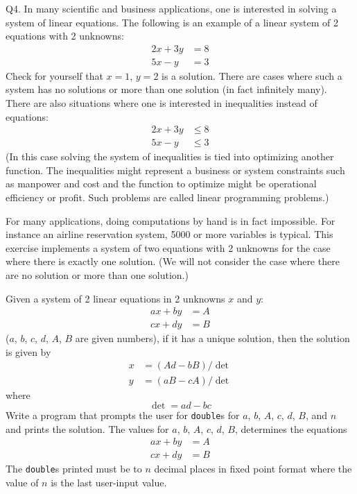 Q4. In many scientific and business applications, one is interested in solving a 
system of linear
equations. 
The following is an example of a linear system of 2 equations with 2 unknowns:
\begin{align*}
2x + 3y &= 8 \\
5x - y &= 3
\end{align*}
Check for yourself that $x = 1$, $y = 2$ is a solution. 
There are cases where such a system has no
solutions or more than one solution (in fact infinitely many). There are also situations where one is
interested in inequalities instead of equations:
\begin{align*}
2x + 3y &\leq 8 \\
5x -  y &\leq 3
\end{align*}
(In this case solving the system of inequalities is tied into optimizing 
another function. 
The inequalities
might represent a business or system constraints such as manpower and cost 
and the function to
optimize might be operational efficiency or profit. Such problems are called linear programming
problems.)

For many applications, doing computations by hand is in fact impossible. 
For instance an airline
reservation system, 5000 or more variables is typical. 
This exercise implements a system of two
equations with 2 unknowns for the case where there is exactly one solution. 
(We will not consider the
case where there are no solution or more than one solution.)

Given a system of 2 linear equations in 2 unknowns $x$ and $y$:
\begin{align*}
ax + by &= A \\
cx + dy &= B
\end{align*}
($a$, $b$, $c$, $d$, $A$, $B$ are given numbers), 
if it has a unique solution, then the solution is given by
\begin{align*}
x &= (Ad - bB) / \operatorname{det} \\
y &= (aB - cA) / \operatorname{det}
\end{align*}
where
\[
\operatorname{det} = ad - bc
\]
Write a program that prompts the user for \texttt{double}s for 
$a$, $b$, $A$, $c$, $d$, $B$, and $n$ and prints the solution. The
values for $a$, $b$, $A$, $c$, $d$, $B$,
determines the equations
\begin{align*}
ax + by &= A \\
cx + dy &= B
\end{align*}
The \texttt{double}s
printed must be to $n$ decimal places in fixed point format 
where the value of $n$ is the last
user-input value.


